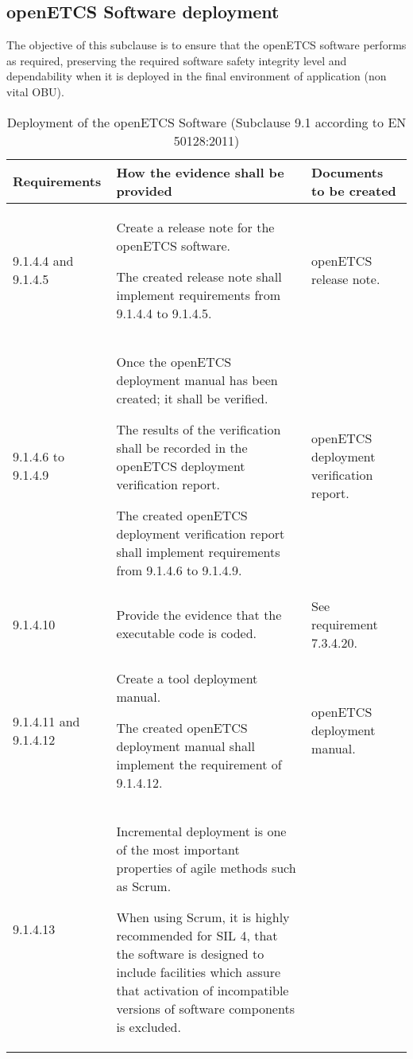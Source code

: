 \documentclass{template/openetcs_report}
\begin{document}
\subsection{openETCS Software deployment}
\begin{flushleft}
The objective of this subclause is to ensure that the openETCS software performs as required, preserving the required software safety integrity level and dependability when it is deployed in the final environment of application (non vital OBU).
\end{flushleft}
{\footnotesize\sffamily\centering
\begin{longtable}{|p{2cm}|p{9cm}|p{3cm}|}
\caption{Deployment of the openETCS Software (Subclause 9.1 according to EN 50128:2011)}\\
\hline
\bfseries Requirements & \bfseries How the evidence shall be provided & \bfseries Documents to be created\\
\hline
\hline
\endhead
\hline
\endfoot

9.1.4.4 and 9.1.4.5 & Create a release note for the openETCS software.

The created release note shall implement requirements from 9.1.4.4 to 9.1.4.5.
& openETCS release note.\\ 
\hline
9.1.4.6 to 9.1.4.9 & Once the openETCS deployment manual has been created; it shall be verified.

The results of the verification shall be recorded in the openETCS deployment verification report.

The created openETCS deployment verification report shall implement requirements from 9.1.4.6 to 9.1.4.9.
& openETCS deployment verification report.\\ 
\hline
9.1.4.10 & Provide the evidence that the executable code is coded. 
& See requirement 7.3.4.20.\\ 
\hline
9.1.4.11 and 9.1.4.12 & Create a tool deployment manual.

The created openETCS deployment manual shall implement the requirement of 9.1.4.12.& openETCS deployment manual.\\ 
\hline
9.1.4.13 & Incremental deployment is one of the most important properties of agile methods such as Scrum.

When using Scrum, it is highly recommended for SIL 4, that the software is designed to include facilities which assure that activation of incompatible versions of software components is excluded.


\end{longtable}}
\end{document}
